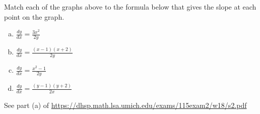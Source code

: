 \documentclass[11pt]{exam}
\begin{document}
\begin{questions}
\begin{multicols}{3}
\end{multicols}
Match each of the graphs above to the formula below that gives the slope at each point on the graph.
\begin{multicols}{2}
\begin{enumerate}[(a)]
\item $\displaystyle\frac{dy}{dx} =\frac{3x^2}{2y}$
\item $\displaystyle\frac{dy}{dx} =\frac{(x-1)(x+2)}{2y}$
\item $\displaystyle\frac{dy}{dx} =\frac{x^2-1}{2y}$
\item $\displaystyle\frac{dy}{dx} =\frac{(y-1)(y+2)}{2x}$
\end{enumerate}
\end{multicols}
\begin{solution}
  See part (a) of \href{https://dhsp.math.lsa.umich.edu/exams/115exam2/w18/s2.pdf}{https://dhsp.math.lsa.umich.edu/exams/115exam2/w18/s2.pdf} 
\end{solution}
\end{questions}
\end{document}
